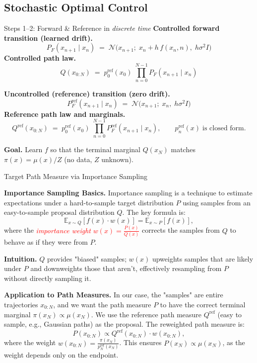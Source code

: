 \documentclass[aspectratio=169,xcolor=dvipsnames]{beamer}
\begin{document}
\subsection{Stochastic Optimal Control}

\begin{frame}[t]{Steps 1--2: Forward \& Reference in \textit{discrete time}}
\footnotesize
\textbf{Controlled forward transition (learned drift).}
\[
P_F(x_{n+1}\mid x_n)\;=\;\mathcal N\!\big(x_{n+1};\;x_n + h\,f(x_n,n),\;h\sigma^2 I\big)
\]
\textbf{Controlled path law.}
\[
Q(x_{0:N})\;=\;p^{\text{ref}}_0(x_0)\;\prod_{n=0}^{N-1} P_F(x_{n+1}\mid x_n)
\]

\medskip
\textbf{Uncontrolled (reference) transition (zero drift).}
\[
P_F^{\text{ref}}(x_{n+1}\mid x_n)\;=\;\mathcal N\!\big(x_{n+1};\;x_n,\;h\sigma^2 I\big)
\]
\textbf{Reference path law and marginals.}
\[
Q^{\text{ref}}(x_{0:N})\;=\;p^{\text{ref}}_0(x_0)\;\prod_{n=0}^{N-1} P_F^{\text{ref}}(x_{n+1}\mid x_n),
\qquad p^{\text{ref}}_n(x)\;\text{is closed form.}
\]

\medskip
\textbf{Goal.} Learn $f$ so that the terminal marginal $Q(x_N)$ matches $\pi(x)=\mu(x)/Z$ (no data, $Z$ unknown).
\end{frame}

\begin{frame}[t]{Target Path Measure via Importance Sampling}
\footnotesize

\textbf{Importance Sampling Basics.} Importance sampling is a technique to estimate expectations under a hard-to-sample target distribution \( P \) using samples from an easy-to-sample proposal distribution \( Q \). The key formula is:
\[
\mathbb{E}_{x \sim Q} \left[ f(x) \cdot w(x) \right] = \mathbb{E}_{x \sim P} [f(x)],
\]
where the \textcolor{red}{\emph{importance weight} \( w(x) = \frac{P(x)}{Q(x)} \)} corrects the samples from \( Q \) to behave as if they were from \( P \).

\textbf{Intuition.} \( Q \) provides "biased" samples; \( w(x) \) upweights samples that are likely under \( P \) and downweights those that aren't, effectively resampling from \( P \) without directly sampling it.

\textbf{Application to Path Measures.} In our case, the "samples" are entire trajectories \( x_{0:N} \), and we want the path measure \( P \) to have the correct terminal marginal \( \pi(x_N) \propto \mu(x_N) \). We use the reference path measure \( Q^{\text{ref}} \) (easy to sample, e.g., Gaussian paths) as the proposal. The reweighted path measure is:
\[
P(x_{0:N}) \propto Q^{\text{ref}}(x_{0:N}) \cdot w(x_{0:N}),
\]
where the weight \( w(x_{0:N}) = \frac{\pi(x_N)}{p^{\text{ref}}_N(x_N)} \). This ensures \( P(x_N) \propto \mu(x_N) \), as the weight depends only on the endpoint.

\end{frame}
\end{document}
